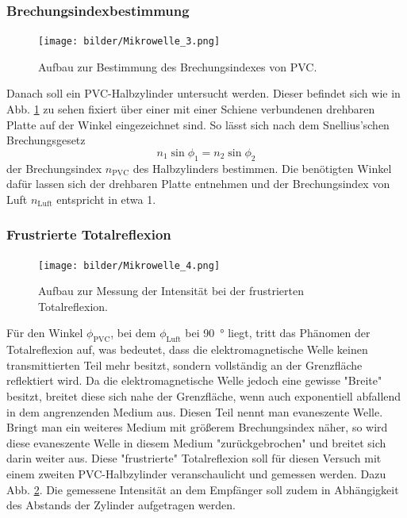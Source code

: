 		\subsubsection*{Brechungsindexbestimmung}
		\begin{figure}[ht]
			\centering
			\texttt{[image: bilder/Mikrowelle\_3.png]}
			\caption{Aufbau zur Bestimmung des Brechungsindexes von PVC.\cite{WWU}}
			\label{fig:Aufbau3}	
		\end{figure}
		Danach soll ein PVC-Halbzylinder untersucht werden. 
		Dieser befindet sich wie in Abb. \ref{fig:Aufbau3} zu sehen fixiert über einer mit einer Schiene verbundenen drehbaren Platte auf der Winkel eingezeichnet sind.
		So lässt sich nach dem Snellius'schen Brechungsgesetz
		\begin{equation} \label{eq:snell}
			n_1 \sin{\phi_1} = n_2 \sin{\phi_2}
		\end{equation}
		der Brechungsindex $n_\text{PVC}$ des Halbzylinders bestimmen. 
		Die benötigten Winkel dafür lassen sich der drehbaren Platte entnehmen und der Brechungsindex von Luft $n_\text{Luft}$ entspricht in etwa 1.
		
		\subsubsection*{Frustrierte Totalreflexion}
		\begin{figure}[ht]
			\centering
			\texttt{[image: bilder/Mikrowelle\_4.png]}
			\caption{Aufbau zur Messung der Intensität bei der frustrierten Totalreflexion.\cite{WWU}}
			\label{fig:Aufbau4}	
		\end{figure}
		Für den Winkel $\phi_\text{PVC}$, bei dem $\phi_\text{Luft}$ bei \SI{90}{\degree} liegt, tritt das Phänomen der Totalreflexion auf, was bedeutet, dass die elektromagnetische Welle keinen transmittierten Teil mehr besitzt, sondern vollständig an der Grenzfläche reflektiert wird. 
		Da die elektromagnetische Welle jedoch eine gewisse "Breite" besitzt, breitet diese sich nahe der Grenzfläche, wenn auch exponentiell abfallend in dem angrenzenden Medium aus.
		Diesen Teil nennt man evaneszente Welle.
		Bringt man ein weiteres Medium mit größerem Brechungsindex näher, so wird diese evaneszente Welle in diesem Medium "zurückgebrochen" und breitet sich darin weiter aus.
		Diese "frustrierte" Totalreflexion soll für diesen Versuch mit einem zweiten PVC-Halbzylinder veranschaulicht und gemessen werden. 
		Dazu Abb. \ref{fig:Aufbau4}.
		Die gemessene Intensität an dem Empfänger soll zudem in Abhängigkeit des Abstands der Zylinder aufgetragen werden.		
		
